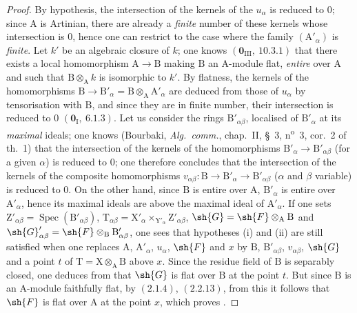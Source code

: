 \begin{proof}
By hypothesis, the intersection of the kernels of the $u_\alpha$ is reduced to $0$; since $\mathrm{A}$ is Artinian,
there are already a \emph{finite} number of these kernels whose intersection is $0$, hence one can
restrict to the case where the family $(\mathrm{A}'_\alpha)$ is \emph{finite}. Let $k'$ be an algebraic closure of $k$; one knows
$(\mathbf{0}_{\mathrm{III}},~10.3.1)$ that there exists a local homomorphism $\mathrm{A}\to\mathrm{B}$ making $\mathrm{B}$ an $\mathrm{A}$-module
flat, \emph{entire} over $\mathrm{A}$ and such that $\mathrm{B}\otimes_\mathrm{A} k$ is isomorphic to $k'$.
By flatness, the kernels of the homomorphisms $\mathrm{B}\to\mathrm{B}'_\alpha=\mathrm{B}\otimes_\mathrm{A}\mathrm{A}'_\alpha$ are deduced from those of
$u_\alpha$ by tensorisation with $\mathrm{B}$, and since they are in finite number, their intersection is
reduced to $0$ $(\mathbf{0}_\mathrm{I},~6.1.3)$. Let us consider the rings $\mathrm{B}'_{\alpha\beta}$, localised of $\mathrm{B}'_\alpha$ at its \emph{maximal} ideals;
one knows (Bourbaki, \emph{Alg.\ comm.}, chap.~II, \S~3, n\textsuperscript{o}~3, cor.~2 of th.~1) that the intersection
of the kernels of the homomorphisms $\mathrm{B}'_\alpha\to\mathrm{B}'_{\alpha\beta}$ (for a given $\alpha$) is reduced to $0$; one therefore concludes
that the intersection of the kernels of the composite homomorphisms $v_{\alpha\beta}:\mathrm{B}\to\mathrm{B}'_\alpha\to\mathrm{B}'_{\alpha\beta}$ ($\alpha$ and
$\beta$ variable) is reduced to $0$. On the other hand, since $\mathrm{B}$ is entire over $\mathrm{A}$, $\mathrm{B}'_\alpha$ is entire over $\mathrm{A}'_\alpha$,
hence its maximal ideals are above the maximal ideal of $\mathrm{A}'_\alpha$. If one sets
$\mathrm{Z}'_{\alpha\beta}=\operatorname{Spec}(\mathrm{B}'_{\alpha\beta})$, $\mathrm{T}_{\alpha\beta}=\mathrm{X}'_\alpha\times_{\mathrm{Y}'_\alpha}\mathrm{Z}'_{\alpha\beta}$, $\sh{G}=\sh{F}\otimes_\mathrm{A}\mathrm{B}$ and $\sh{G}'_{\alpha\beta}=\sh{F}\otimes_\mathrm{B}\mathrm{B}'_{\alpha\beta}$, one sees
that hypotheses (i) and (ii) are still satisfied when one replaces
$\mathrm{A}$, $\mathrm{A}'_\alpha$, $u_\alpha$, $\sh{F}$ and $x$ by $\mathrm{B}$, $\mathrm{B}'_{\alpha\beta}$, $v_{\alpha\beta}$, $\sh{G}$ and a point $t$ of $\mathrm{T}=\mathrm{X}\otimes_\mathrm{A}\mathrm{B}$ above $x$.
Since the residue field of $\mathrm{B}$ is separably closed, one deduces from  that
$\sh{G}$ is flat over $\mathrm{B}$ at the point $t$. But since $\mathrm{B}$ is an $\mathrm{A}$-module faithfully flat, by $(2.1.4)$,
$(2.2.13)$, from this it follows that $\sh{F}$ is flat over $\mathrm{A}$ at the point $x$, which proves .
\end{proof}

